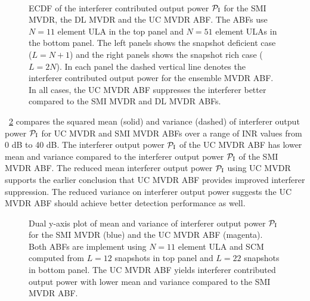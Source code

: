 \begin{figure}[!hp]
  \centering
  \\
  \vfill
  \caption[ECDF of the interferer contributed output power $\pinter$
  for the SMI MVDR, the DL MVDR and the UC MVDR ABF.]{ECDF of the
    interferer contributed output power $\pinter$ for the SMI MVDR,
    the DL MVDR and the UC MVDR ABF. The ABFs use $N = 11$ element ULA
    in the top panel and $N = 51$ element ULAs in the bottom
    panel. The left panels shows the snapshot deficient case
    ($L = N + 1$) and the right panels shows the snapshot rich case
    ($L = 2N$). In each panel the dashed vertical line denotes the
    interferer contributed output power for the ensemble MVDR ABF. In
    all cases, the UC MVDR ABF suppresses the interferer better
    compared to the SMI MVDR and DL MVDR ABFs.}
  \label{fig:ecdf-plots}
\end{figure}

\figurename{}~\ref{fig:pout-mean-var-plots} compares the squared mean
(solid) and variance (dashed) of interferer output power $\pinter$ for
UC MVDR and SMI MVDR ABFs over a range of INR values from 0 dB to 40
dB. The interferer output power $\pinter$ of the UC MVDR ABF has lower
mean and variance compared to the interferer output power $\pinter$ of
the SMI MVDR ABF. The reduced mean interferer output power $\pinter$
using UC MVDR supports the earlier conclusion that UC MVDR ABF
provides improved interferer suppression. The reduced variance on
interferer output power suggests the UC MVDR ABF should achieve better
detection performance as well.

\begin{figure*}[!hp]
  \centering
    \hfill
  \caption[Dual y-axis plot of mean and variance of interferer output power $\pinter$ for the SMI MVDR (blue) and the UC MVDR ABF (magenta).]{Dual y-axis plot of mean and variance of interferer output power $\pinter$ for the SMI MVDR (blue) and the UC MVDR ABF (magenta). Both ABFs are implement using $N = 11$ element ULA and SCM computed from $L = 12$ snapshots in top panel and $L = 22$ snapshots in bottom panel. The UC MVDR ABF yields interferer contributed output power with lower mean and variance compared to the SMI MVDR ABF.}
  \label{fig:pout-mean-var-plots}
\end{figure*}

